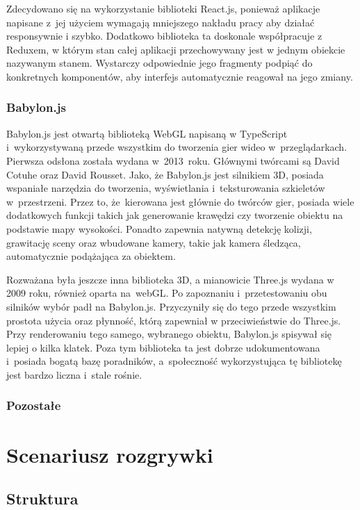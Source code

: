 \documentclass[11pt,a4paper,polish,thesis]{dcsbook}
\begin{document}
	Zdecydowano się na wykorzystanie biblioteki React.js, ponieważ aplikacje napisane z~jej użyciem wymagają mniejszego nakładu pracy aby działać responsywnie i szybko. Dodatkowo biblioteka ta doskonale współpracuje z Reduxem, w którym stan całej aplikacji przechowywany jest w jednym obiekcie nazywanym stanem. Wystarczy odpowiednie jego fragmenty podpiąć do konkretnych komponentów, aby interfejs automatycznie reagował na jego zmiany. 
		
		
	\subsubsection{Babylon.js}

	Babylon.js jest otwartą biblioteką WebGL napisaną w TypeScript i~wykorzystywaną przede wszystkim do tworzenia gier wideo w~przeglądarkach. Pierwsza odsłona została wydana w~2013~roku. Głównymi twórcami są David Cotuhe oraz David Rousset. Jako, że Babylon.js jest silnikiem 3D, posiada wspaniałe narzędzia do tworzenia, wyświetlania i~teksturowania szkieletów w~przestrzeni. Przez to, że~kierowana jest głównie do twórców gier, posiada wiele dodatkowych funkcji takich jak generowanie krawędzi czy tworzenie obiektu na podstawie mapy wysokości. Ponadto zapewnia natywną detekcję kolizji, grawitację sceny oraz wbudowane kamery, takie jak kamera śledząca, automatycznie podążająca za obiektem. 
	
	Rozważana była jeszcze inna biblioteka 3D, a mianowicie Three.js wydana w 2009 roku, również oparta na~webGL. Po zapoznaniu i~przetestowaniu obu silników wybór padł na Babylon.js. Przyczyniły się do tego przede wszystkim prostota użycia oraz płynność, którą zapewniał w przeciwieństwie do Three.js. Przy renderowaniu tego samego, wybranego obiektu, Babylon.js spisywał się lepiej o kilka klatek. Poza tym biblioteka ta jest dobrze udokumentowana i~posiada bogatą bazę poradników, a~społeczność wykorzystująca tę bibliotekę jest bardzo liczna i~stale rośnie.
	
	\subsubsection{Pozostałe}
	
	\section{Scenariusz rozgrywki}
	
	\subsection{Struktura} \label{Struktura}
	
\end{document}
